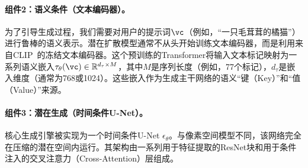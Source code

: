 \documentclass[../../book-main_zh.tex]{subfiles}
\begin{document}
\paragraph{组件2：语义条件（文本编码器）。}
为了引导生成过程，我们需要对用户的提示词$\vc$（例如，“一只毛茸茸的橘猫”）进行鲁棒的语义表示。潜在扩散模型通常不从头开始训练文本编码器，而是利用来自CLIP~\citep{radford2021learning}的冻结文本编码器。这个预训练的Transformer将输入文本标记映射为一系列语义嵌入$\tau_\theta(\vc) \in \mathbb{R}^{d_\tau \times M}$，其中$M$是序列长度（例如，77个标记），$d_\tau$是嵌入维度（通常为768或1024）。这些嵌入作为生成主干网络的语义“键（Key）”和“值（Value）”来源。

\paragraph{组件3：潜在生成（时间条件U-Net）。}
核心生成引擎被实现为一个时间条件U-Net $\epsilon_\theta$。与像素空间模型不同，该网络完全在压缩的潜在空间内运行。其架构由一系列用于特征提取的ResNet块和用于条件注入的交叉注意力（Cross-Attention）层组成。
\end{document}
